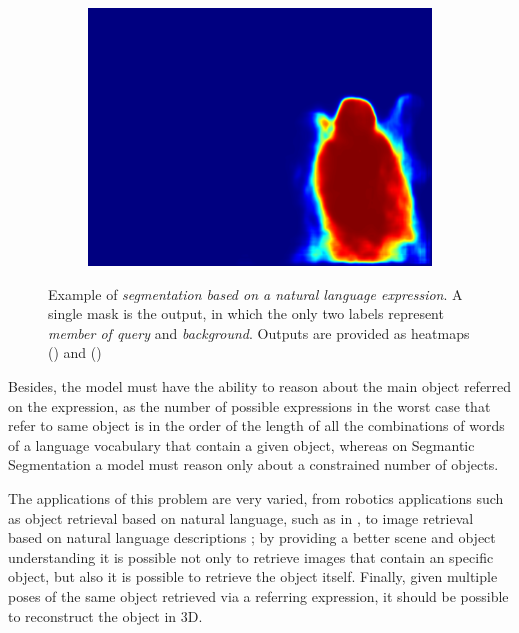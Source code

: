 \begin{figure}
\begin{subfigure}[b]{0.25\columnwidth}
            \centering
            \includegraphics[width=\textwidth]{./figures/Mask_2.png}
    \label{subfig:man_blue}
    \end{subfigure}
    \caption{\label{fig:query} Example of \textit{segmentation based on a natural language expression}. A single mask is the output, in which the only two labels represent \textit{member of query} and \textit{background}. Outputs are provided as heatmaps () and ()}
    \label{Fig:Intro_Descr}
\end{figure}

Besides, the model must have the ability to reason about the main object referred on the expression, as the number of possible expressions in the worst case that refer to same object is in the order of the length of all the combinations of words of a language vocabulary that contain a given object, whereas on Segmantic Segmentation a model must reason only about a constrained number of objects.

The applications of this problem are very varied, from robotics applications such as object retrieval based on natural language, such as in \cite{guadarrama_understanding_2016}, to image retrieval based on natural language descriptions \cite{schuster2015generating}; by providing a better scene and object understanding it is possible not only to retrieve images that contain an specific object, but also it is possible to retrieve the object itself. Finally, given multiple poses of the same object retrieved via a referring expression, it should be possible to reconstruct the object in 3D.

